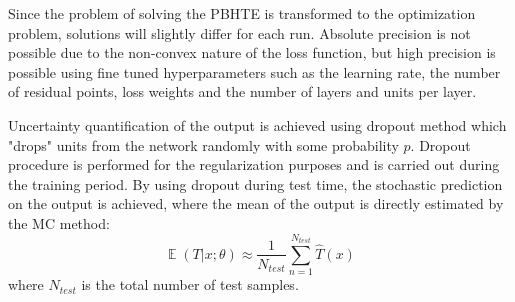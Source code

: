 \documentclass[conference]{IEEEtran}
\begin{document}
Since the problem of solving the PBHTE is transformed to the optimization problem, solutions will slightly differ for each run. Absolute precision is not possible due to the non-convex nature of the loss function, but high precision is possible using fine tuned hyperparameters such as the learning rate, the number of residual points, loss weights and the number of layers and units per layer.

Uncertainty quantification of the output is achieved using dropout method which "drops" units from the network randomly with some probability $p$. Dropout procedure is performed for the regularization purposes and is carried out during the training period. By using dropout during test time, the stochastic prediction on the output is achieved, where the mean of the output is directly estimated by the MC method:
\begin{equation}
    \mathop{\mathbb{E}}(T|x; \theta) \approx \frac{1}{N_{test}}\sum_{n=1}^{N_{test}} \hat{T}(x)
    \label{eqn.mcdropout}
\end{equation}
where $N_{test}$ is the total number of test samples.
\end{document}

